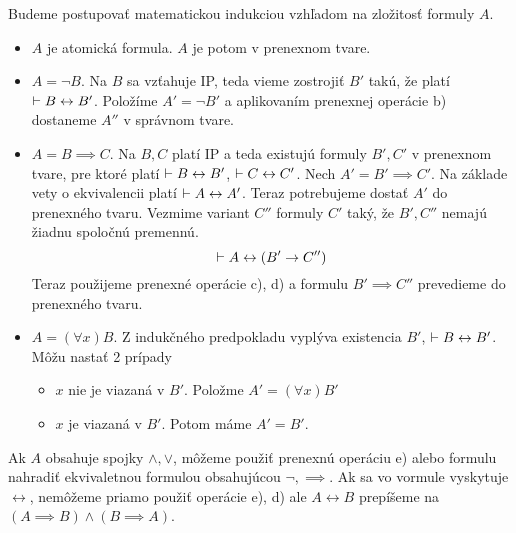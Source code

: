 \begin{dokaz}
Budeme postupovať matematickou indukciou vzhľadom na zložitosť formuly $A$.
\begin{itemize}
    \item $A$ je atomická formula. $A$ je potom v prenexnom tvare.

    \item $A=\neg B$. Na $B$ sa vzťahuje IP, teda vieme zostrojiť
        $B'$ takú, že platí
        $\vdash B \leftrightarrow B'$.
        Položíme $A'=\neg B'$ a aplikovaním prenexnej operácie b) dostaneme 
        $A''$ v správnom tvare.

    \item $A=B \implies C$. Na $B,C$ platí IP a teda existujú formuly
        $B',C'$ v prenexnom tvare, pre ktoré platí
        $\vdash B \leftrightarrow B'$, $\vdash C \leftrightarrow C'$.
        Nech $A' = B' \implies C'$. Na základe vety o ekvivalencii platí
        $\vdash A \leftrightarrow A'$. Teraz potrebujeme dostať
        $A'$ do prenexného tvaru.
        Vezmime variant $C''$ formuly $C'$ taký, že $B',C''$ nemajú
        žiadnu spoločnú premennú.
        \begin{equation*}
            \vdash A \leftrightarrow (B' \rightarrow C'')
        \end{equation*}
        Teraz použijeme prenexné operácie c), d) a formulu
        $B' \implies C''$ prevedieme do prenexného tvaru.

    \item $A=(\forall x)B$. Z indukčného predpokladu vyplýva
        existencia $B'$, $\vdash B \leftrightarrow B'$.
        Môžu nastať 2 prípady
        \begin{itemize}
        \item $x$ nie je viazaná v $B'$. Položme $A' = (\forall x) B'$
        \item $x$ je viazaná v $B'$. Potom máme $A' = B'$.
        \end{itemize}
\end{itemize}
\end{dokaz}
\begin{poznamka}
    Ak $A$ obsahuje spojky 
    $\land,\lor$, môžeme použiť prenexnú operáciu e) alebo formulu nahradiť
    ekvivaletnou formulou obsahujúcou $\neg,\implies$.
    Ak sa vo vormule vyskytuje $\leftrightarrow$, nemôžeme priamo
    použiť operácie e), d) ale $A\leftrightarrow B$ prepíšeme na
    $(A\implies B) \land (B \implies A)$.
\end{poznamka}


